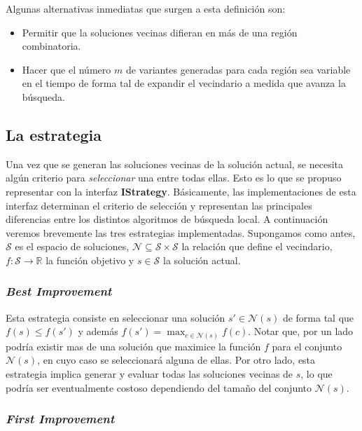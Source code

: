 Algunas alternativas inmediatas que surgen a esta definici\'on son:
\begin{itemize}
 \item Permitir que la soluciones vecinas difieran en m\'as de una regi\'on
combinatoria.
 \item Hacer que el n\'umero $m$ de variantes generadas para cada regi\'on sea
variable en el tiempo de forma tal de expandir el vecindario a medida que avanza
la b\'usqueda.
\end{itemize}

\subsection{La estrategia}

Una vez que se generan las soluciones vecinas de la soluci\'on actual, se
necesita alg\'un criterio para \textit{seleccionar} una entre todas ellas. Esto
es lo que se propuso representar con la interfaz \textbf{IStrategy}.
B\'asicamente, las implementaciones de esta interfaz determinan el criterio de
selecci\'on y representan las principales diferencias entre los distintos
algoritmos de b\'usqueda local. A continuaci\'on veremos brevemente las tres
estrategias implementadas. Supongamos como antes, $\mathcal{S}$ es el espacio de
soluciones, $\mathcal{N} \subseteq \mathcal{S} \times \mathcal{S}$ la relaci\'on
que define el vecindario, $f: \mathcal{S} \rightarrow \mathbb{R}$ la funci\'on
objetivo y $s \in \mathcal{S}$ la soluci\'on actual.

\subsubsection{\textit{Best Improvement}}

Esta estrategia consiste en seleccionar una soluci\'on $s' \in \mathcal{N}(s)$
de forma tal que $f(s) \leq f(s')$ y adem\'as $f(s') = \max_{c \in
\mathcal{N}(s)} f(c)$. Notar que, por un lado podr\'ia existir mas de una
soluci\'on que maximice la funci\'on $f$ para el conjunto $\mathcal{N}(s)$, en
cuyo caso se seleccionar\'a alguna de ellas. Por otro lado, esta estrategia
implica generar y evaluar todas las soluciones vecinas de $s$, lo que
podr\'ia ser eventualmente costoso dependiendo del tama\~no del conjunto
$\mathcal{N}(s)$.

\subsubsection{\textit{First Improvement}}

